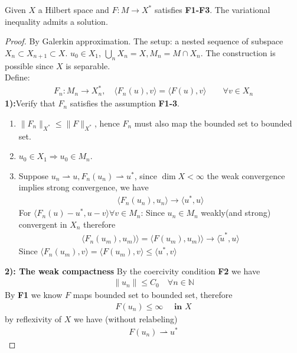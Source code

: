 \begin{theorem}
	Given $X$ a Hilbert space and $F: M \rightarrow X^*$ satisfies \textbf{F1-F3}. The variational inequality admits a solution. 
\end{theorem}
\begin{proof}
	By Galerkin approximation. The setup: a nested sequence of subspace $X_n \subset X_{n + 1} \subset X$. $u_0 \in X_1$, $\bigcup_n X_n = X, M_n = M \cap X_n$. The construction is possible since $X$ is separable. \\
	Define:
	\begin{align*}
		F_n: M_n \rightarrow X_n^*, \quad \langle F_n(u), v \rangle = \langle F(u), v \rangle \qquad \forall v \in X_n
	\end{align*}
	\textbf{1):}Verify that $F_n$ satisfies the assumption \textbf{F1-3}.
	\begin{enumerate}
		\item $\|F_n\|_{X^*} \le \|F\|_{X^*}$, hence $F_n$ must also map the bounded set to bounded set. 
		\item $u_0 \in X_1 \Rightarrow u_0 \in M_n$.
		\item Suppose $u_n \rightharpoonup u, F_n(u_n) \rightharpoonup u^*$, since $\dim X < \infty$ the weak convergence implies strong convergence, we have
		\begin{align*}
			\langle F_n(u_n), u_n \rangle \rightarrow \langle u^*, u \rangle  
		\end{align*}
		For $\langle F_n(u) - u^*, u - v \rangle \forall v \in M_n$: Since $u_n \in M_n$ weakly(and strong) convergent in $X_n$  therefore  
		\begin{align*}
			\langle F_n(u_m), u_m) \rangle = \langle F(u_m), u_m) \rangle \rightarrow \langle \tilde{u}^*, u\rangle
		\end{align*}
		Since $\langle F_n(u_m), v \rangle = \langle F(u_m), v \rangle \le \langle u^*, v \rangle$
	\end{enumerate}
	\textbf{2): The weak compactness}
	By the coercivity condition \textbf{F2} we have
	\begin{align*}
		\|u_n\| \le C_0 \quad \forall n \in \mathbb{N}
	\end{align*}
	By \textbf{F1} we know $F$ maps bounded set to bounded set, therefore
	\begin{align*}
		F(u_n) \le \infty \quad \textbf{ in } X
	\end{align*}  
	by reflexivity of $X$ we have (without relabeling)
	\begin{align*}
		F(u_n) \rightharpoonup u^*

\end{align*}
\end{proof}
